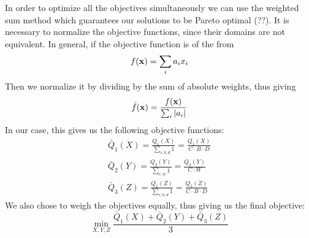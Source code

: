 \documentclass[]{article}
\begin{document}
In order to optimize all the objectives simultaneously we can use the weighted sum method which guarantees our solutions to be Pareto optimal (??). It is necessary to normalize the objective functions, since their domains are not equivalent. In general, if the objective function is of the from
\[
 	f(\vb{x}) = \sum_i a_ix_i
\]
Then we normalize it by dividing by the sum of absolute weights, thus giving
\[
	\bar{f}(\vb{x}) = \frac{f(\vb{x})}{\sum_i \abs{a_i}}
\]
In our case, this gives us the following objective functions:
	\begin{align*}
		\bar{Q}_1(X) = \frac{Q_1(X)}{\sum_{c, b, d} 1} = \frac{Q_1(X)}{C \cdot B \cdot D} \\
		\bar{Q}_2(Y) = \frac{Q_2(Y)}{\sum_{c, w} 1} = \frac{Q_2(Y)}{C \cdot W} \\
		\bar{Q}_3(Z) = \frac{Q_1(Z)}{\sum_{c, b, d} 1} = \frac{Q_3(Z)}{C \cdot B \cdot D}
	\end{align*}
We also chose to weigh the objectives equally, thus giving us the final objective:
	\begin{equation}
		\min_{X, Y, Z} \frac{\bar{Q}_1(X) + \bar{Q}_2(Y) + \bar{Q}_3(Z)}{3}
	\end{equation}
\end{document}
